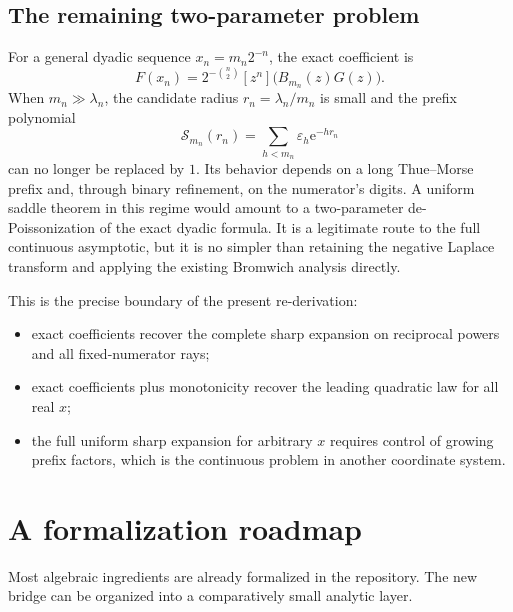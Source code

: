 \documentclass[11pt,oneside]{article}
\theoremstyle{definition}
\theoremstyle{remark}
\newcommand{\e}{\mathrm e}
\newcommand{\Prefix}{\mathcal S}
\newcommand{\TM}{\varepsilon}
\begin{document}
\subsection{The remaining two-parameter problem}

For a general dyadic sequence $x_n=m_n2^{-n}$, the exact coefficient is
\begin{equation}
 F(x_n)=2^{-\binom n2}[z^n]\bigl(B_{m_n}(z)G(z)\bigr).
\end{equation}
When $m_n\gg\lambda_n$, the candidate radius $r_n=\lambda_n/m_n$ is small and the prefix polynomial
\begin{equation}
 \Prefix_{m_n}(r_n)=\sum_{h<m_n}\TM_h\e^{-hr_n}
\label{eq:large-prefix-problem}
\end{equation}
can no longer be replaced by $1$.  Its behavior depends on a long Thue--Morse prefix and, through binary refinement, on the numerator's digits.  A uniform saddle theorem in this regime would amount to a two-parameter de-Poissonization of the exact dyadic formula.  It is a legitimate route to the full continuous asymptotic, but it is no simpler than retaining the negative Laplace transform and applying the existing Bromwich analysis directly.

This is the precise boundary of the present re-derivation:
\begin{itemize}
\item exact coefficients recover the complete sharp expansion on reciprocal powers and all fixed-numerator rays;
\item exact coefficients plus monotonicity recover the leading quadratic law for all real $x$;
\item the full uniform sharp expansion for arbitrary $x$ requires control of growing prefix factors, which is the continuous problem in another coordinate system.
\end{itemize}

\section{A formalization roadmap}
\label{sec:formalization}

Most algebraic ingredients are already formalized in the repository.  The new bridge can be organized into a comparatively small analytic layer.
\end{document}
